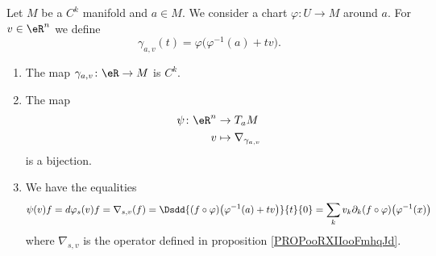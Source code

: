 \begin{proposition}     \label{PROPooRXIIooFmhqJd}
	Let \( M\) be a \( C^k\) manifold and \( a\in M\). We consider a chart \( \varphi\colon U\to M\) around \( a\). For \( v\in \eR^n\) we define
	\begin{equation}
		\gamma_{a,v}(t)=\varphi\big( \varphi^{-1}(a)+tv \big).
	\end{equation}
	\begin{enumerate}
		\item
		      The map \( \gamma_{a,v}\colon \eR\to M\) is \( C^k\).
		\item
		      The map
		      \begin{equation}
			      \begin{aligned}
				      \psi\colon \eR^n & \to T_aM                      \\
				      v                & \mapsto \nabla_{\gamma_{a,v}}
			      \end{aligned}
		      \end{equation}
		      is a bijection.
		\item
		      We have the equalities
		      \begin{equation}
			      \psi(v)f=d\varphi_s(v)f=\nabla_{s,v}(f)=\Dsdd{ (f\circ\varphi)\big( \varphi^{-1}(a)+tv \big) }{t}{0}=\sum_kv_k\partial_k(f\circ\varphi)\big( \varphi^{-1}(x) \big)
		      \end{equation}
		      where \( \nabla_{s,v}\) is the operator defined in proposition \ref{PROPooRXIIooFmhqJd}.
	\end{enumerate}
\end{proposition}

